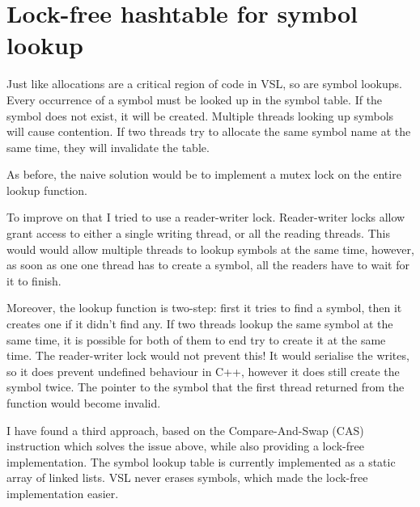 
\section{Lock-free hashtable for symbol lookup}
\label{sec:hashtable}
Just like allocations are a critical region of code in VSL, so are symbol lookups.
Every occurrence of a symbol must be looked up in the symbol table. If the symbol does
not exist, it will be created. Multiple threads looking up symbols will cause contention.
If two threads try to allocate the same symbol name at the same time, they will invalidate
the table.

As before, the naive solution would be to implement a mutex lock on the entire
lookup function.

To improve on that I tried to use a reader-writer lock. Reader-writer locks allow grant access
to either a single writing thread, or all the reading threads. This would would allow multiple
threads to lookup symbols at the same time, however, as soon as one one thread has to create a
symbol, all the readers have to wait for it to finish.

Moreover, the lookup function is two-step: first it tries to find a symbol, then it creates one
if it didn't find any. If two threads lookup the same symbol at the same time, it is possible for
both of them to end try to create it at the same time. The reader-writer lock would not prevent this!
It would serialise the writes, so it does prevent undefined behaviour in C++, however it does still
create the symbol twice. The pointer to the symbol that the first thread returned from the function
would become invalid.

I have found a third approach, based on the Compare-And-Swap (CAS) instruction which solves the issue
above, while also providing a lock-free implementation. The symbol lookup table is currently implemented
as a static array of linked lists. VSL never erases symbols, which made the lock-free implementation easier.

